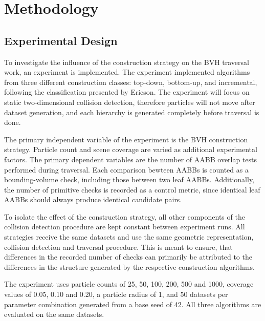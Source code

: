  \chapter{Methodology}

\section{Experimental Design}
    
To investigate the influence of the construction strategy on the BVH traversal work, an experiment is implemented. 
The experiment implemented algorithms from three different construction classes: top-down, bottom-up, and incremental, following the classification presented by Ericson\cite[p.~239]{ericson2004real}. %
The experiment will focus on static two-dimensional collision detection, therefore particles will not move after dataset generation, and each hierarchy is generated completely before traversal is done.

The primary independent variable of the experiment is the BVH construction strategy. 
Particle count and scene coverage are varied as additional experimental factors. 
The primary dependent variables are the number of AABB overlap tests performed during traversal.
Each comparison bewteen AABBs is counted as a bounding-volume check, including those between two leaf AABBs.
Additionally, the number of primitive checks is recorded as a control metric, since identical leaf AABBs should always produce identical candidate pairs. %

To isolate the effect of the construction strategy, all other components of the collision detection procedure are kept constant between experiment runs.
All strategies receive the same datasets and use the same geometric representation, collision detection and traversal procedure. 
This is meant to ensure, that differences in the recorded number of checks can primarily be attributed to the differences in the structure generated by the respective construction algorithms.

The experiment uses particle counts of 25, 50, 100, 200, 500 and 1000, coverage values of 0.05, 0.10 and 0.20, a particle radius of 1, and 50 datasets per parameter combination generated from a base seed of 42.
All three algorithms are evaluated on the same datasets.

